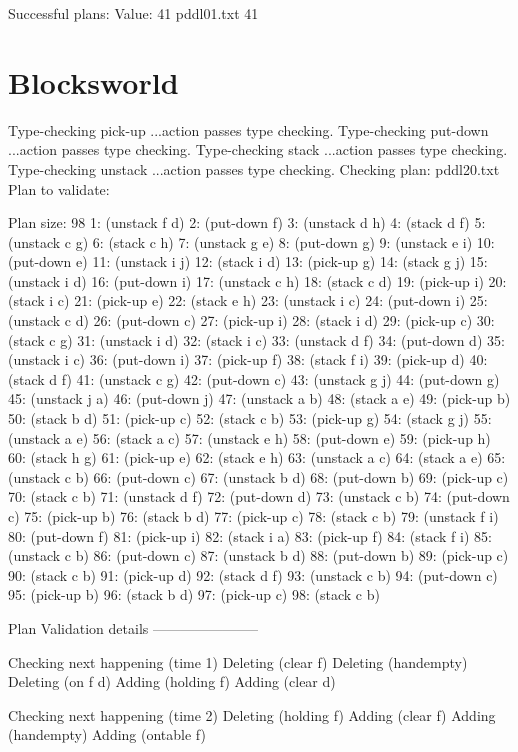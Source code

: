 Successful plans:
Value: 41
 pddl01.txt 41 
\section{Blocksworld}
Type-checking pick-up
...action passes type checking.
Type-checking put-down
...action passes type checking.
Type-checking stack
...action passes type checking.
Type-checking unstack
...action passes type checking.
Checking plan: pddl20.txt
Plan to validate:

Plan size: 98
1:
(unstack f d)
2:
(put-down f)
3:
(unstack d h)
4:
(stack d f)
5:
(unstack c g)
6:
(stack c h)
7:
(unstack g e)
8:
(put-down g)
9:
(unstack e i)
10:
(put-down e)
11:
(unstack i j)
12:
(stack i d)
13:
(pick-up g)
14:
(stack g j)
15:
(unstack i d)
16:
(put-down i)
17:
(unstack c h) 
18:
(stack c d) 
19:
(pick-up i) 
20:
(stack i c) 
21:
(pick-up e) 
22:
(stack e h) 
23:
(unstack i c) 
24:
(put-down i) 
25:
(unstack c d) 
26:
(put-down c) 
27:
(pick-up i) 
28:
(stack i d) 
29:
(pick-up c) 
30:
(stack c g) 
31:
(unstack i d) 
32:
(stack i c) 
33:
(unstack d f) 
34:
(put-down d) 
35:
(unstack i c) 
36:
(put-down i) 
37:
(pick-up f) 
38:
(stack f i) 
39:
(pick-up d) 
40:
(stack d f) 
41:
(unstack c g) 
42:
(put-down c) 
43:
(unstack g j) 
44:
(put-down g) 
45:
(unstack j a) 
46:
(put-down j) 
47:
(unstack a b) 
48:
(stack a e) 
49:
(pick-up b) 
50:
(stack b d) 
51:
(pick-up c) 
52:
(stack c b) 
53:
(pick-up g) 
54:
(stack g j) 
55:
(unstack a e) 
56:
(stack a c) 
57:
(unstack e h) 
58:
(put-down e) 
59:
(pick-up h) 
60:
(stack h g) 
61:
(pick-up e) 
62:
(stack e h) 
63:
(unstack a c) 
64:
(stack a e) 
65:
(unstack c b) 
66:
(put-down c) 
67:
(unstack b d) 
68:
(put-down b) 
69:
(pick-up c) 
70:
(stack c b) 
71:
(unstack d f) 
72:
(put-down d) 
73:
(unstack c b) 
74:
(put-down c) 
75:
(pick-up b) 
76:
(stack b d) 
77:
(pick-up c) 
78:
(stack c b) 
79:
(unstack f i) 
80:
(put-down f) 
81:
(pick-up i) 
82:
(stack i a) 
83:
(pick-up f) 
84:
(stack f i) 
85:
(unstack c b) 
86:
(put-down c) 
87:
(unstack b d) 
88:
(put-down b) 
89:
(pick-up c) 
90:
(stack c b) 
91:
(pick-up d) 
92:
(stack d f) 
93:
(unstack c b) 
94:
(put-down c) 
95:
(pick-up b) 
96:
(stack b d) 
97:
(pick-up c) 
98:
(stack c b) 

Plan Validation details
-----------------------

Checking next happening (time 1)
Deleting (clear f)
Deleting (handempty)
Deleting (on f d)
Adding (holding f)
Adding (clear d)

Checking next happening (time 2)
Deleting (holding f)
Adding (clear f)
Adding (handempty)
Adding (ontable f)

